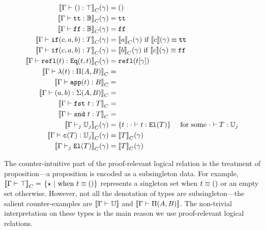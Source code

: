 \begin{align*}
  \denotesC{\goodTerm{\Gm}{\unit}{\top}}(\gm) &= \unit\\
  \denotesC{\goodTerm{\Gm}{\true}{\cB}}(\gm) &= \true \\
  \denotesC{\goodTerm{\Gm}{\false}{\cB}}(\gm) &= \false \\
  \denotesC{\goodTerm{\Gm}{\ifb{c}{a}{b}}{T}}(\gm) &= \denotesC{a}(\gm) \text{ if } \denotes{c}(\gm) \equiv \true \\
  \denotesC{\goodTerm{\Gm}{\ifb{c}{a}{b}}{T}}(\gm) &= \denotesC{b}(\gm) \text{ if } \denotes{c}(\gm) \equiv \false \\
  \denotesC{\goodTerm{\Gm}{\eqrefl{t}}{\TyId{t}{t}}}(\gm) &= \eqrefl{\sub{t}{\gm}}\\
  \denotesC{\goodTerm{\Gm}{\lam{t}}{\TyPi{A}{B}}} &= \\
  \denotesC{\goodTerm{\Gm}{\app{t}}{B}} &= \\
  \denotesC{\goodTerm{\Gm}{\pair{a}{b}}{\TySigma{A}{B}}} &= \\
  \denotesC{\goodTerm{\Gm}{\fst{t}}{T}} &= \\
  \denotesC{\goodTerm{\Gm}{\snd{t}}{T}} &= \\
  \denotesC{\goodType{\Gm}{\cU_j}{j}}(\gm) &= \{t : \goodTerm{\cdot}{t}{\El{T}}\} \quad \text{     for some } \goodTerm{\cdot}{T}{\cU_j}  \\
  \denotesC{\goodTerm{\Gm}{\codety{T}}{\cU_j}}(\gm) &= \denotesC{T}(\gm) \\ 
  \denotesC{\goodType{\Gm}{\El{T}}{j}}(\gm) &= \denotesC{T}(\gm) \\
\end{align*}

\newcommand{\Glued}[1]{\ensuremath{{#1}^c}}
\newcommand{\GluedPi}[2]{\ensuremath{\Pi^c({#1},{#2})}}
\newcommand{\GSubstExt}[2]{\ensuremath{{#1},^c{#2}}}
\newcommand{\Gpair}[2]{\ensuremath{({#1},^c{#2})}}
\newcommand{\Gfst}[1]{\ensuremath{\texttt{fst}^c~{#1}}}
\newcommand{\Gsnd}[1]{\ensuremath{\texttt{snd}^c~{#1}}}
\newcommand{\Gsub}[2]{\ensuremath{{#1}\!\left[{#2}\right]^c}}
\newcommand{\Gapp}[1]{\ensuremath{\texttt{app}^c({#1})}}
\newcommand{\GSubstWeak}[1]{\ensuremath{(\texttt{p}^c)^{#1}}}
\newcommand{\GLSigAdd}[3]{\ensuremath{\nu^{+c}({#1},{#2},{#3})}}
\newcommand{\GCaseSig}[3]{\ensuremath{\texttt{CaseTy}^c({#1},{#2},{#3})}}

The counter-intuitive part of the proof-relevant logical relation is the treatment of proposition---a proposition is encoded as a subsingleton data. For example, $\denotesC{\goodType{\Gm}{\top}{}} = $ $ \{\star \ | \text{  when } t \equiv \unit \}$ represents a singleton set when $t \equiv \unit$ or an empty set otherwise. However, not all the denotation of types are subsingleton---the salient counter-examples are $\denotes{\goodType{\Gm}{\cU}{}}$ and $\denotes{\goodType{\Gm}{\TyPi{A}{B}}{}}$. The non-trivial interpretation on these types is the main reason we use proof-relevant logical relations.


